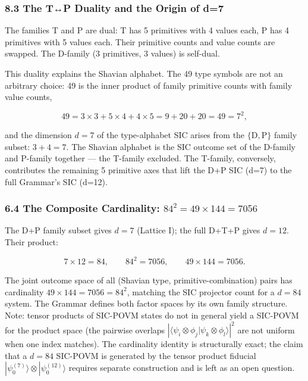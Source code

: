 \hypertarget{the-tp-duality-and-the-origin-of-d7}{%
\subsubsection{8.3 The T↔P Duality and the Origin of
d=7}\label{the-tp-duality-and-the-origin-of-d7}}

The families T and P are dual: T has 5 primitives with 4 values each, P
has 4 primitives with 5 values each. Their primitive counts and value
counts are swapped. The D-family (3 primitives, 3 values) is self-dual.

This duality explains the Shavian alphabet. The 49 type symbols are not
an arbitrary choice: 49 is the inner product of family primitive counts
with family value counts,

\[49 = 3 \times 3 + 5 \times 4 + 4 \times 5 = 9 + 20 + 20 = 49 = 7^2,\]

and the dimension \(d=7\) of the type-alphabet SIC arises from the
\(\{\mathrm{D,P}\}\) family subset: \(3 + 4 = 7\). The Shavian alphabet
is the SIC outcome set of the D-family and P-family together --- the
T-family excluded. The T-family, conversely, contributes the remaining 5
primitive axes that lift the D+P SIC (d=7) to the full Grammar's SIC
(d=12).

\hypertarget{the-composite-cardinality-842-49-times-144-7056}{%
\subsubsection{\texorpdfstring{6.4 The Composite Cardinality:
\(84^2 = 49 \times 144 = 7056\)}{6.4 The Composite Cardinality: 84\^{}2 = 49 \textbackslash times 144 = 7056}}\label{the-composite-cardinality-842-49-times-144-7056}}

The D+P family subset gives \(d=7\) (Lattice I); the full D+T+P gives
\(d=12\). Their product:

\[7 \times 12 = 84, \qquad 84^2 = 7056, \qquad 49 \times 144 = 7056.\]

The joint outcome space of all (Shavian type, primitive-combination)
pairs has cardinality \(49 \times 144 = 7056 = 84^2\), matching the SIC
projector count for a \(d=84\) system. The Grammar defines both factor
spaces by its own family structure. Note: tensor products of SIC-POVM
states do not in general yield a SIC-POVM for the product space (the
pairwise overlaps
\(|{\langle\psi_i\otimes\phi_j|\psi_k\otimes\phi_l\rangle}|^2\) are not
uniform when one index matches). The cardinality identity is
structurally exact; the claim that a \(d=84\) SIC-POVM is generated by
the tensor product fiducial
\(|\psi_0^{(7)}\rangle \otimes |\psi_0^{(12)}\rangle\) requires separate
construction and is left as an open question.

